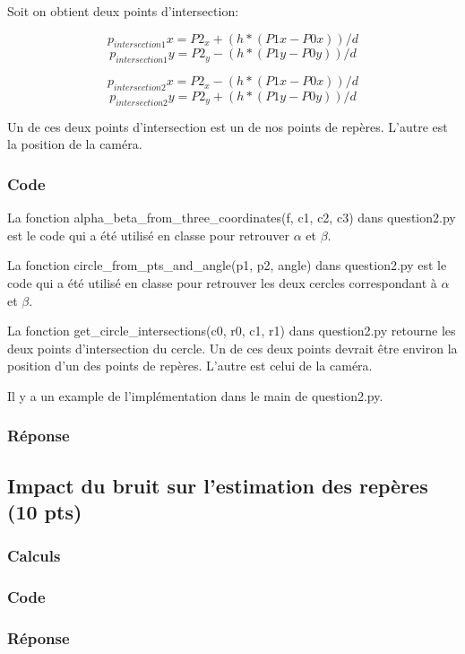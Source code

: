 \documentclass[12pt]{article}
\begin{document}
Soit on obtient deux points d'intersection:

\[  p_{intersection1}x = P2_x + (h*(P1x - P0x))/d \]
\[  p_{intersection1}y = P2_y - (h*(P1y - P0y))/d \]

\[  p_{intersection2}x = P2_x - (h*(P1x - P0x))/d \]
\[  p_{intersection2}y = P2_y + (h*(P1y - P0y))/d \]

Un de ces deux points d'intersection est un de nos points de rep\`eres.
L'autre est la position de la cam\'era.

\subsubsection{Code}
La fonction alpha\_beta\_from\_three\_coordinates(f, c1, c2, c3) dans question2.py est le code qui a été utilisé en classe pour retrouver $\alpha$ et $\beta$.

La fonction circle\_from\_pts\_and\_angle(p1, p2, angle) dans question2.py est le code qui a été utilisé en classe pour retrouver les deux cercles correspondant \`a $\alpha$ et $\beta$.

La fonction get\_circle\_intersections(c0, r0, c1, r1) dans question2.py retourne les deux points d'intersection du cercle.
Un de ces deux points devrait \^etre environ la position d'un des points de rep\`eres.
L'autre est celui de la cam\'era.

Il y a un example de l'impl\'ementation dans le main de question2.py.

\subsubsection{Réponse}

\subsection{Impact du bruit sur l'estimation des repères (10 pts)}
\subsubsection{Calculs}
\subsubsection{Code}
\subsubsection{Réponse}

\newpage
\end{document}
